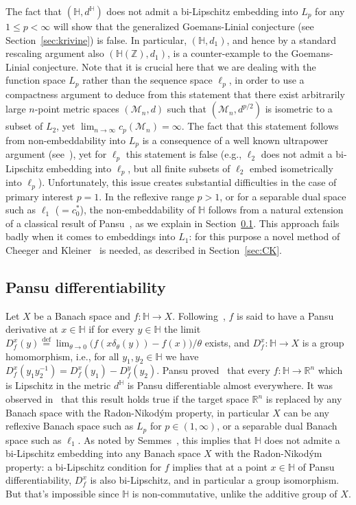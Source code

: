 \documentclass{icm2010}
\theoremstyle{definition}
\newcommand{\R}{\mathbb{R}}
\newcommand{\eqdef}{\stackrel{\mathrm{def}}{=}}
\newcommand{\1}{\mathbf{1}}
\newcommand{\M}{\mathscr{M}}
\renewcommand{\H}{\mathbb{H}}
\newcommand{\Z}{\mathbb{Z}}
\renewcommand{\le}{\leqslant}
\begin{document}
The fact that $(\H,d^\H)$ does not admit a bi-Lipschitz embedding
into $L_p$ for any $1\le p<\infty$ will show that the generalized
Goemans-Linial conjecture (see Section~\ref{sec:krivine}) is false.
In particular, $(\H,d_1)$, and hence by a standard rescaling
argument also $(\H(\Z),d_1)$, is a counter-example to the
Goemans-Linial conjecture. Note that it is crucial here that we are
dealing with the function space $L_p$ rather than the sequence space
$\ell_p$, in order to use a compactness argument to deduce from this
statement that there exist arbitrarily large $n$-point metric spaces
$(\M_n,d)$ such that $(\M_n,d^{p/2})$ is isometric to a subset of
$L_2$, yet $\lim_{n\to \infty} c_p(\M_n)=\infty$. The fact that this
statement follows from non-embeddability into $L_p$ is a consequence
of a well known ultrapower argument (see~\cite{Hei80}), yet for
$\ell_p$ this statement is false (e.g., $\ell_2$ does not admit a
bi-Lipschitz embedding into $\ell_p$, but all finite subsets of
$\ell_2$ embed isometrically into $\ell_p$). Unfortunately, this
issue creates substantial difficulties in the case of primary
interest $p=1$. In the reflexive range $p>1$, or for a separable
dual space such as $\ell_1$ ($=c_0^*$), the non-embeddability of
$\H$ follows from a natural extension of a classical result of
Pansu~\cite{Pan89}, as we explain in Section~\ref{sec:pansu}. This
approach fails badly when it comes to embeddings into $L_1$: for
this purpose a novel method of Cheeger and Kleiner~\cite{ckbv} is
needed, as described in Section~\ref{sec:CK}.


\subsection{Pansu differentiability}\label{sec:pansu}

Let $X$ be a Banach space and $f:\H\to X$. Following~\cite{Pan89},
$f$ is said to have a Pansu derivative at $x\in \H$ if for every
$y\in \H$ the limit $ D_f^x(y)\eqdef \lim_{\theta\to 0}
\big(f(x\delta_\theta(y))-f(x)\big)/\theta$ exists, and $D^x_f:\H\to
X$ is a group homomorphism, i.e., for all $y_1,y_2\in \H$ we have
$D_f^x(y_1y_2^{-1})=D_f^x(y_1)-D_f^y(y_2)$. Pansu
proved~\cite{Pan89} that every $f:\H\to \R^n$ which is Lipschitz in
the metric $d^\H$ is Pansu differentiable almost everywhere. It was
observed in~\cite{LN06,CK06-RNP} that this result holds true if the
target space $\R^n$ is replaced by any Banach space with the
Radon-Nikod\'ym property, in particular $X$ can be any reflexive
Banach space such as $L_p$ for $p\in (1,\infty)$, or a separable
dual Banach space such as $\ell_1$. As noted by Semmes~\cite{Sem96},
this implies that $\H$ does not admite a bi-Lipschitz embedding into
any Banach space $X$ with the Radon-Nikod\'ym property: a
bi-Lipschitz condition for $f$ implies that at a point $x\in \H$ of
Pansu differentiability, $D_f^x$ is also bi-Lipschitz, and in
particular a group isomorphism. But that's impossible since $\H$ is
non-commutative, unlike the additive group of $X$.
\end{document}

